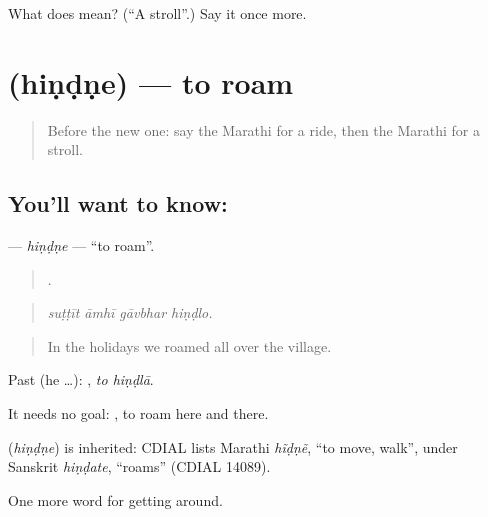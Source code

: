 \begin{tcolorbox}[breakable,colback=teal!4,colframe=teal!35!black,title={Before you move on}]
What does  mean? (\textquotedblleft{}A stroll\textquotedblright{}.) Say it once more.
\end{tcolorbox}
\section[\texorpdfstring{\mr{हिंडणे} (hiṇḍṇe)}{हिंडणे (hiṇḍṇe)}]{ (hiṇḍṇe) — to roam}

\label{lesson:MR-C411-hindne}



\begin{quote}
Before the new one: say the Marathi for a ride, then the Marathi for a stroll.
\end{quote}

\subsection*{You'll want to know: }
\textbf{} — \emph{hiṇḍṇe} — \textquotedblleft{}to roam\textquotedblright{}.

\begin{quote}
   .
\end{quote}

\begin{quote}
\emph{suṭṭīt āmhī gāvbhar hiṇḍlo.}
\end{quote}

\begin{quote}
In the holidays we roamed all over the village.
\end{quote}

Past (he …):  , \emph{to hiṇḍlā}.

It needs no goal:  , to roam here and there.

\begin{cousinweb}
\textbf{} (\emph{hiṇḍṇe}) is inherited: CDIAL lists Marathi \emph{hĩḍṇẽ}, \textquotedblleft{}to move, walk\textquotedblright{}, under Sanskrit \emph{hiṇḍate}, \textquotedblleft{}roams\textquotedblright{} (CDIAL 14089).
\end{cousinweb}

\begin{grammarlens}[title={What you've built}]
One more word for getting around.
\end{grammarlens}


